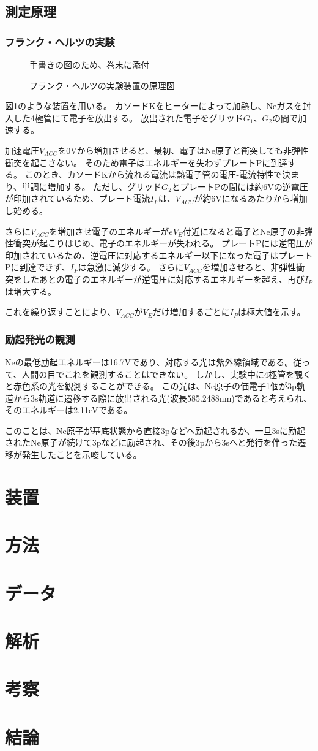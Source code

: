 \documentclass[uplatex,11pt]{jsarticle}
\newcommand{\dummyfig}[2]{
    \begin{figure}
        \begin{center}
            \begin{shadebox}
                手書きの図のため、巻末に添付
            \end{shadebox}
            \caption{#2}
            \label{fg_#1}
        \end{center}
    \end{figure}
}
\newcommand{\fr}[1]{図\ref{fg_#1}}
\begin{document}
\subsection{測定原理}

\subsubsection{フランク・ヘルツの実験}

\dummyfig{vaccum_tube}{フランク・ヘルツの実験装置の原理図}

\fr{vaccum_tube}のような装置を用いる。
カソードKをヒーターによって加熱し、Neガスを封入した4極管にて電子を放出する。
放出された電子をグリッド$G_1$、$G_2$の間で加速する。

加速電圧$V_{ACC}$を0Vから増加させると、最初、電子はNe原子と衝突しても非弾性衝突を起こさない。
そのため電子はエネルギーを失わずプレートPに到達する。
このとき、カソードKから流れる電流は熱電子管の電圧-電流特性で決まり、単調に増加する。
ただし、グリッド$G_2$とプレートPの間には約6Vの逆電圧が印加されているため、プレート電流$I_P$は、$V_{ACC}$が約6Vになるあたりから増加し始める。

さらに$V_{ACC}$を増加させ電子のエネルギーが$eV_E$付近になると電子とNe原子の非弾性衝突が起こりはじめ、電子のエネルギーが失われる。
プレートPには逆電圧が印加されているため、逆電圧に対応するエネルギー以下になった電子はプレートPに到達できず、$I_P$は急激に減少する。
さらに$V_{ACC}$を増加させると、非弾性衝突をしたあとの電子のエネルギーが逆電圧に対応するエネルギーを超え、再び$I_P$は増大する。

これを繰り返すことにより、$V_{ACC}$が$V_E$だけ増加するごとに$I_P$は極大値を示す。

\subsubsection{励起発光の観測}

Neの最低励起エネルギーは16.7Vであり、対応する光は紫外線領域である。従って、人間の目でこれを観測することはできない。
しかし、実験中に4極管を覗くと赤色系の光を観測することができる。
この光は、Ne原子の価電子1個が3p軌道から3s軌道に遷移する際に放出される光(波長585.2488nm)であると考えられ、そのエネルギーは2.11eVである。

このことは、Ne原子が基底状態から直接3pなどへ励起されるか、一旦3sに励起されたNe原子が続けて3pなどに励起され、その後3pから3sへと発行を伴った遷移が発生したことを示唆している。

\section{装置}
\section{方法}
\section{データ}
\section{解析}
\section{考察}
\section{結論}
\end{document}
